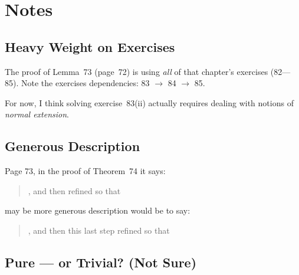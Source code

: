 


\section{Notes}

\subsection{Heavy Weight on Exercises}

The proof of Lemma~73 (page~72) is using \emph{all} of
that chapter's exercises (82---85).
Note the exercises dependencies: 83 \(\rightarrow\) 84 \(\rightarrow\) 85.

For now, %
I think solving exercise~83(ii) actually requires
dealing with notions of
\emph{normal extension}.
\iffalse
and may be even
 \index{algebraic closure}
 \index{closure!algebraic}
 \emph{algebraic closure}.
\fi

\subsection{Generous Description}

Page 73, in the proof of Theorem~74 it says:
\begin{quotation}
\mldots, and then refined so that \mldots
\end{quotation}
may be more generous description would be to say:
\begin{quotation}
\mldots, and then this last step refined so that \mldots
\end{quotation}

\subsection{Pure --- or Trivial? (Not Sure)}

